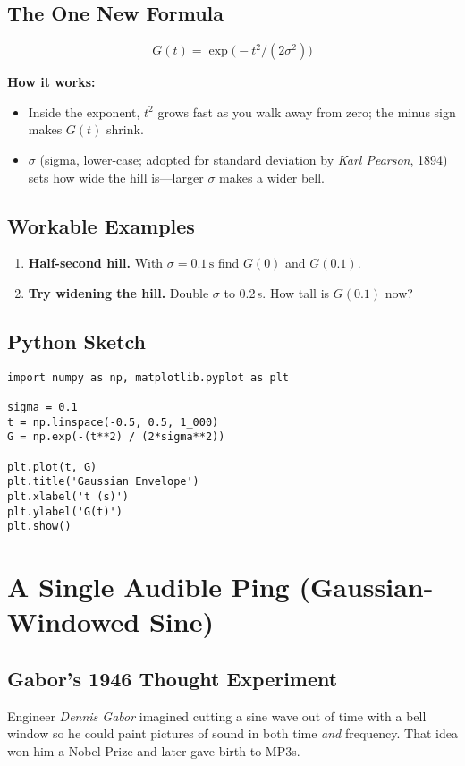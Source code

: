 \documentclass[12pt]{article}
\begin{document}
\subsection*{The One New Formula}
\begin{equation}
  G(t)=\exp\!\bigl(-t^{2}/(2\sigma^{2})\bigr)
\end{equation}

\textbf{How it works:}
\begin{itemize}
  \item Inside the exponent, \(t^{2}\) grows fast as you walk away from zero; the minus sign makes \(G(t)\) shrink.
  \item \(\sigma\) (sigma, lower-case; adopted for standard deviation by \textit{Karl Pearson}, 1894) sets how wide the hill is—larger \(\sigma\) makes a wider bell.
\end{itemize}

\subsection*{Workable Examples}
\begin{enumerate}
  \item \textbf{Half-second hill.}  With \(\sigma=0.1\,\text{s}\) find \(G(0)\) and \(G(0.1)\).
  \item \textbf{Try widening the hill.}  Double \(\sigma\) to 0.2\,s. How tall is \(G(0.1)\) now?
\end{enumerate}

\subsection*{Python Sketch}
\begin{lstlisting}[caption=Gaussian envelope,label=lst:gaussian]
import numpy as np, matplotlib.pyplot as plt

sigma = 0.1
t = np.linspace(-0.5, 0.5, 1_000)
G = np.exp(-(t**2) / (2*sigma**2))

plt.plot(t, G)
plt.title('Gaussian Envelope')
plt.xlabel('t (s)')
plt.ylabel('G(t)')
plt.show()
\end{lstlisting}

\section{A Single Audible Ping (Gaussian-Windowed Sine)}
\subsection*{Gabor’s 1946 Thought Experiment}
Engineer \textit{Dennis Gabor} imagined cutting a sine wave out of time with a bell window so he could paint pictures of sound in both time \emph{and} frequency. That idea won him a Nobel Prize and later gave birth to MP3s.
\end{document}
